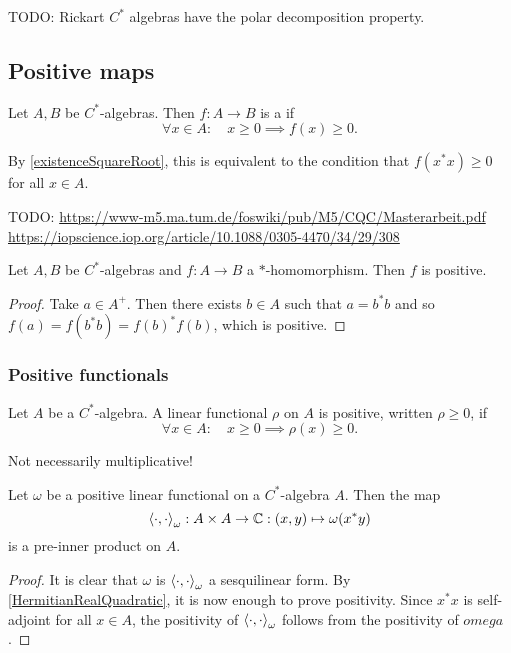 TODO: Rickart $C^*$ algebras have the polar decomposition property.


\subsection{Positive maps}
\begin{definition}
Let $A,B$ be $C^*$-algebras. Then $f:A\to B$ is a  if
\[ \forall x\in A: \quad x\geq 0 \implies f(x)\geq 0. \]
\end{definition}
By \ref{existenceSquareRoot}, this is equivalent to the condition that $f(x^*x)\geq 0$ for all $x\in A$.

TODO: \url{https://www-m5.ma.tum.de/foswiki/pub/M5/CQC/Masterarbeit.pdf}
\url{https://iopscience.iop.org/article/10.1088/0305-4470/34/29/308}

\begin{lemma} \label{starHomomorphismPositive}
Let $A,B$ be $C^*$-algebras and $f:A\to B$ a $*$-homomorphism. Then $f$ is positive.
\end{lemma}
\begin{proof}
Take $a\in A^+$. Then there exists $b\in A$ such that $a = b^*b$ and so $f(a) = f(b^*b) = f(b)^*f(b)$, which is positive.
\end{proof}

\subsubsection{Positive functionals}
\begin{definition}
Let $A$ be a $C^*$-algebra. A linear functional $\rho$ on $A$ is positive, written $\rho\geq 0$, if
\[ \forall x\in A: \quad x\geq 0 \implies \rho(x)\geq 0. \]
\end{definition}
Not necessarily multiplicative!

\begin{lemma} \label{positiveLinearFunctionalPreinnerProduct}
Let $\omega$ be a positive linear functional on a $C^*$-algebra $A$. Then the map
\[ \left\langle \cdot, \cdot \right\rangle_\omega: A\times A \to \mathbb{C}: (x,y)\mapsto \omega(x^*y) \]
is a pre-inner product on $A$.
\end{lemma}
\begin{proof}
It is clear that $\omega$ is $\left\langle \cdot, \cdot \right\rangle_\omega$ a sesquilinear form. By \ref{HermitianRealQuadratic}, it is now enough to prove positivity. Since $x^*x$ is self-adjoint for all $x\in A$, the positivity of $\left\langle \cdot, \cdot \right\rangle_\omega$ follows from the positivity of $omega$.
\end{proof}

